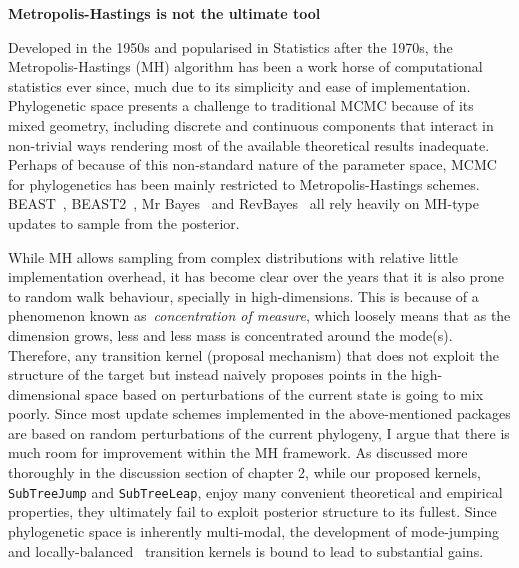 \textbf{Metropolis-Hastings is not the ultimate tool}

Developed in the 1950s and popularised in Statistics after the 1970s, the Metropolis-Hastings (MH) algorithm has been a work horse of computational statistics ever since, much due to its simplicity and ease of implementation.
Phylogenetic space presents a challenge to traditional MCMC because of its mixed geometry, including discrete and continuous components that interact in non-trivial ways rendering most of the available theoretical results inadequate.
Perhaps of because of this non-standard nature of the parameter space, MCMC for phylogenetics has been mainly restricted to Metropolis-Hastings schemes.
BEAST~\citep{Drummond2012}, BEAST2~\citep{Bouckaert2014}, Mr Bayes~\citep{Huelsenbeck2001a} and RevBayes~\citep{Hoehna2016} all rely heavily on MH-type updates to sample from the posterior.

While MH allows sampling from complex distributions with relative little implementation overhead, it has become clear over the years that it is also prone to random walk behaviour, specially in high-dimensions.
This is because of a phenomenon known as~\textit{concentration of measure}, which loosely means that as the dimension grows, less and less mass is concentrated around the mode(s).
Therefore, any transition kernel (proposal mechanism) that does not exploit the structure of the target but instead naively proposes points in the high-dimensional space based on perturbations of the current state is going to mix poorly.
Since most update schemes implemented in the above-mentioned packages are based on random perturbations of the current phylogeny, I argue that there is much room for improvement within the MH framework.
As discussed more thoroughly in the discussion section of chapter 2, while our proposed kernels, \verb|SubTreeJump| and \verb|SubTreeLeap|, enjoy many convenient theoretical and empirical properties, they ultimately fail to exploit posterior structure to its fullest.
Since phylogenetic space is inherently multi-modal, the development of mode-jumping~\citep{Tjelmeland2001} and locally-balanced~\citep{Zanella2017} transition kernels is bound to lead to substantial gains.

